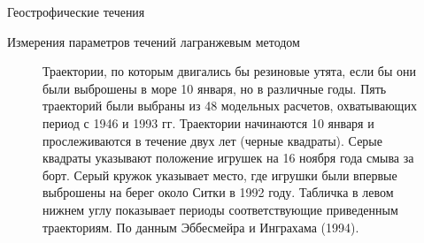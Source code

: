 \begin{chapter}{Геострофические течения}
\begin{section}{Измерения параметров течений лагранжевым методом}
\begin{figure}[b!]
\caption{Траектории, по которым двигались бы резиновые утята, если бы
они были выброшены в море 10 января, но в различные годы. Пять
траекторий были выбраны из 48 модельных расчетов, охватывающих период
с 1946 и 1993 гг. Траектории начинаются 10 января и прослеживаются в
течение двух лет (черные квадраты). Серые квадраты указывают положение
игрушек на 16 ноября года смыва за борт. Серый кружок указывает место,
где игрушки были впервые выброшены на берег около Ситки в 1992
году. Табличка в левом нижнем углу показывает периоды соответствующие
приведенным траекториям. По данным Эббесмейра и Инграхама (1994).}
\label{fig:duckies}
\end{figure}
%


\end{section}
\end{chapter}
